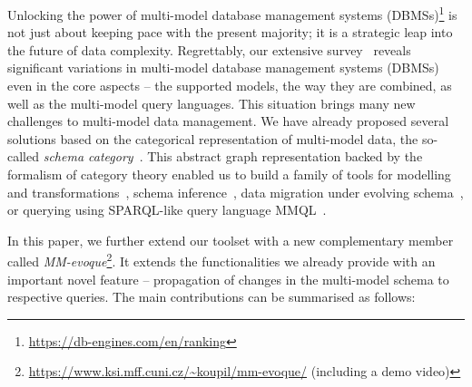 Unlocking the power of multi-model database management systems (DBMSs)\footnote{\url{https://db-engines.com/en/ranking}} is not just about keeping pace with the present majority; it is a strategic leap into the future of data complexity.
Regrettably, our extensive survey~\citep{CSUR-Jiaheng} reveals significant variations in multi-model database management systems (DBMSs) even in the core aspects -- the supported models, the way they are combined, as well as the multi-model query languages.
This situation brings many new challenges to multi-model data management. We have already proposed several solutions based on the categorical representation of multi-model data, the so-called \textit{schema category}~\citep{mm_cat_journal}. This abstract graph representation backed by the formalism of category theory enabled us to build a family of tools for modelling and transformations~\citep{mm_cat}, schema inference~\citep{mm_infer}, data migration under evolving schema~\citep{cikm_2022}, or querying using SPARQL-like query language MMQL~\citep{koupil2023universal}. 


In this paper, we further extend our toolset with a new complementary member called \textit{MM-evoque}\footnote{\url{https://www.ksi.mff.cuni.cz/~koupil/mm-evoque/} (including a demo video)}. It extends the functionalities we already provide with an important novel feature -- propagation of changes in the multi-model schema to respective queries. The main contributions can be summarised as follows:

